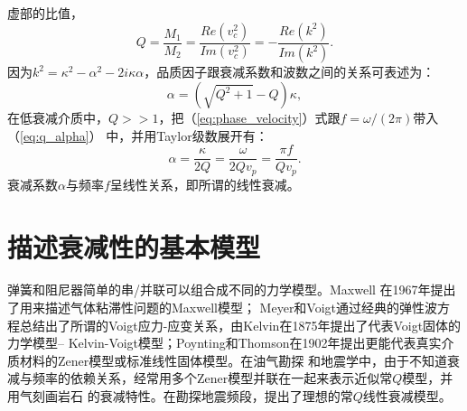 虚部的比值，
\begin{equation}
	Q=\frac{M_1}{M_2}=\frac{Re(v_c^2)}{Im(v_c^2)}=-\frac{Re(k^2)}{Im(k^2)}.
	\label{eq:qm}
\end{equation}
因为$k^2=\kappa^2-\alpha^2-2i\kappa\alpha$，品质因子跟衰减系数和波数之间的关系可表述为：
\begin{equation}
	\alpha=(\sqrt{Q^2+1}-Q)\kappa,
	\label{eq:q_alpha}
\end{equation}
在低衰减介质中，$Q>>1$，把（\ref{eq:phase_velocity}）式跟$f=\omega/(2\pi)$带入（\ref{eq:q_alpha}）
中，并用Taylor级数展开有：
\begin{equation}
	\alpha=\frac{\kappa}{2Q}=\frac{\omega}{2Qv_p}=\frac{\pi f}{Qv_p}.
	\label{eq:linear_visco}
\end{equation}
衰减系数$\alpha$与频率$f$呈线性关系，即所谓的线性衰减。

\section{描述衰减性的基本模型}
\vspace{0.2cm}
弹簧和阻尼器简单的串/并联可以组合成不同的力学模型。Maxwell 在1967年提出了用来描述气体粘滞性问题的Maxwell模型；
Meyer和Voigt通过经典的弹性波方程总结出了所谓的Voigt应力-应变关系，由Kelvin在1875年提出了代表Voigt固体的力学模型--
Kelvin-Voigt模型；Poynting和Thomson在1902年提出更能代表真实介质材料的Zener模型或标准线性固体模型。在油气勘探
和地震学中，由于不知道衰减与频率的依赖关系，经常用多个Zener模型并联在一起来表示近似常$Q$模型，并用气刻画岩石
的衰减特性。在勘探地震频段，提出了理想的常$Q$线性衰减模型。

